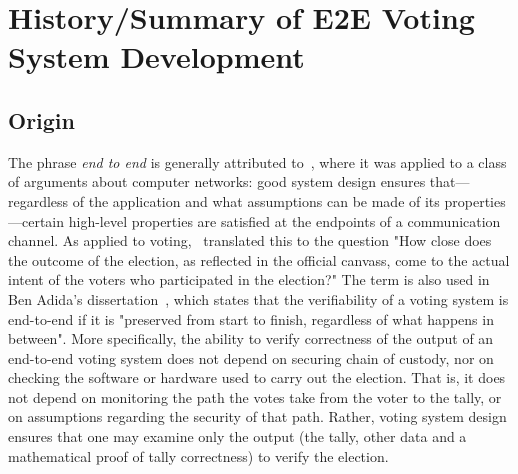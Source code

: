 \chapter{History/Summary of E2E Voting System Development}

\section{Origin}

The phrase \emph{end to end} is generally attributed to~\cite{saltzer1981},
where it was applied to a class of arguments about computer networks: good
system design ensures that---regardless of the application and what
assumptions can be made of its properties---certain high-level properties
are satisfied at the endpoints of a communication channel.  As applied to
voting, \cite{jones2002}~translated this to the question "How close does the
outcome of the election, as reflected in the official canvass, come to the
actual intent of the voters who participated in the election?" The term is
also used in Ben Adida's dissertation~\cite{adida2006}, which states that
the verifiability of a voting system is end-to-end if it is "preserved from
start to finish, regardless of what happens in between". More specifically,
the ability to verify correctness of the output of an end-to-end voting
system does not depend on securing chain of custody, nor on checking the
software or hardware used to carry out the election. That is, it does not
depend on monitoring the path the votes take from the voter to the tally, or
on assumptions regarding the security of that path. Rather, voting system
design ensures that one may examine only the output (the tally, other data
and a mathematical proof of tally correctness) to verify the election.

